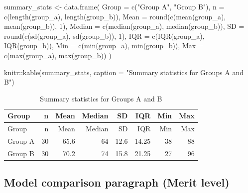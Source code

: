\documentclass[
  11pt,
  a4paper,
  oneside,
  open=any]{scrbook}
\newenvironment{Shaded}{\begin{snugshade}}{\end{snugshade}}
\newcommand{\AttributeTok}[1]{\textcolor[rgb]{0.40,0.45,0.13}{#1}}
\newcommand{\DecValTok}[1]{\textcolor[rgb]{0.68,0.00,0.00}{#1}}
\newcommand{\FunctionTok}[1]{\textcolor[rgb]{0.28,0.35,0.67}{#1}}
\newcommand{\NormalTok}[1]{\textcolor[rgb]{0.00,0.23,0.31}{#1}}
\newcommand{\OtherTok}[1]{\textcolor[rgb]{0.00,0.23,0.31}{#1}}
\newcommand{\SpecialCharTok}[1]{\textcolor[rgb]{0.37,0.37,0.37}{#1}}
\newcommand{\StringTok}[1]{\textcolor[rgb]{0.13,0.47,0.30}{#1}}
\begin{document}
\begin{Shaded}
\begin{Highlighting}[]
\NormalTok{summary\_stats }\OtherTok{\textless{}{-}} \FunctionTok{data.frame}\NormalTok{(}
  \AttributeTok{Group    =} \FunctionTok{c}\NormalTok{(}\StringTok{"Group A"}\NormalTok{, }\StringTok{"Group B"}\NormalTok{),}
  \AttributeTok{n        =} \FunctionTok{c}\NormalTok{(}\FunctionTok{length}\NormalTok{(group\_a), }\FunctionTok{length}\NormalTok{(group\_b)),}
  \AttributeTok{Mean     =} \FunctionTok{round}\NormalTok{(}\FunctionTok{c}\NormalTok{(}\FunctionTok{mean}\NormalTok{(group\_a), }\FunctionTok{mean}\NormalTok{(group\_b)), }\DecValTok{1}\NormalTok{),}
  \AttributeTok{Median   =} \FunctionTok{c}\NormalTok{(}\FunctionTok{median}\NormalTok{(group\_a), }\FunctionTok{median}\NormalTok{(group\_b)),}
  \AttributeTok{SD       =} \FunctionTok{round}\NormalTok{(}\FunctionTok{c}\NormalTok{(}\FunctionTok{sd}\NormalTok{(group\_a), }\FunctionTok{sd}\NormalTok{(group\_b)), }\DecValTok{1}\NormalTok{),}
  \AttributeTok{IQR      =} \FunctionTok{c}\NormalTok{(}\FunctionTok{IQR}\NormalTok{(group\_a), }\FunctionTok{IQR}\NormalTok{(group\_b)),}
  \AttributeTok{Min      =} \FunctionTok{c}\NormalTok{(}\FunctionTok{min}\NormalTok{(group\_a), }\FunctionTok{min}\NormalTok{(group\_b)),}
  \AttributeTok{Max      =} \FunctionTok{c}\NormalTok{(}\FunctionTok{max}\NormalTok{(group\_a), }\FunctionTok{max}\NormalTok{(group\_b))}
\NormalTok{)}

\NormalTok{knitr}\SpecialCharTok{::}\FunctionTok{kable}\NormalTok{(summary\_stats, }\AttributeTok{caption =} \StringTok{"Summary statistics for Groups A and B"}\NormalTok{)}
\end{Highlighting}
\end{Shaded}

\begin{longtable}[]{@{}lrrrrrrr@{}}
\caption{Summary statistics for Groups A and B}\tabularnewline
\toprule\noalign{}
Group & n & Mean & Median & SD & IQR & Min & Max \\
\midrule\noalign{}
\endfirsthead
\toprule\noalign{}
Group & n & Mean & Median & SD & IQR & Min & Max \\
\midrule\noalign{}
\endhead
\bottomrule\noalign{}
\endlastfoot
Group A & 30 & 65.6 & 64 & 12.6 & 14.25 & 38 & 88 \\
Group B & 30 & 70.2 & 74 & 15.8 & 21.25 & 27 & 96 \\
\end{longtable}

\subsection{Model comparison paragraph (Merit
level)}\label{model-comparison-paragraph-merit-level}
\end{document}
